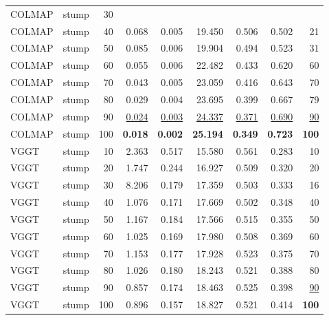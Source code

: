 \begin{table}[H]
\begin{tabular}{llrrrrrrr}
COLMAP & stump & 30 &  &  &  &  &  &  \\
COLMAP & stump & 40 & 0.068 & 0.005 & 19.450 & 0.506 & 0.502 & 21 \\
COLMAP & stump & 50 & 0.085 & 0.006 & 19.904 & 0.494 & 0.523 & 31 \\
COLMAP & stump & 60 & 0.055 & 0.006 & 22.482 & 0.433 & 0.620 & 60 \\
COLMAP & stump & 70 & 0.043 & 0.005 & 23.059 & 0.416 & 0.643 & 70 \\
COLMAP & stump & 80 & 0.029 & 0.004 & 23.695 & 0.399 & 0.667 & 79 \\
COLMAP & stump & 90 & \underline{0.024} & \underline{0.003} & \underline{24.337} & \underline{0.371} & \underline{0.690} & \underline{90} \\
COLMAP & stump & 100 & \textbf{0.018} & \textbf{0.002} & \textbf{25.194} & \textbf{0.349} & \textbf{0.723} & \textbf{100} \\
VGGT & stump & 10 & 2.363 & 0.517 & 15.580 & 0.561 & 0.283 & 10 \\
VGGT & stump & 20 & 1.747 & 0.244 & 16.927 & 0.509 & 0.320 & 20 \\
VGGT & stump & 30 & 8.206 & 0.179 & 17.359 & 0.503 & 0.333 & 16 \\
VGGT & stump & 40 & 1.076 & 0.171 & 17.669 & 0.502 & 0.348 & 40 \\
VGGT & stump & 50 & 1.167 & 0.184 & 17.566 & 0.515 & 0.355 & 50 \\
VGGT & stump & 60 & 1.025 & 0.169 & 17.980 & 0.508 & 0.369 & 60 \\
VGGT & stump & 70 & 1.153 & 0.177 & 17.928 & 0.523 & 0.375 & 70 \\
VGGT & stump & 80 & 1.026 & 0.180 & 18.243 & 0.521 & 0.388 & 80 \\
VGGT & stump & 90 & 0.857 & 0.174 & 18.463 & 0.525 & 0.398 & \underline{90} \\
VGGT & stump & 100 & 0.896 & 0.157 & 18.827 & 0.521 & 0.414 & \textbf{100} \\
\bottomrule
\end{tabular}
\end{table}
